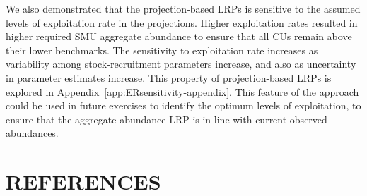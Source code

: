 \documentclass[11pt]{book}
\begin{document}
We also demonstrated that the projection-based LRPs is sensitive to the assumed levels of exploitation rate in the projections. Higher exploitation rates resulted in higher required SMU aggregate abundance to ensure that all CUs remain above their lower benchmarks. The sensitivity to exploitation rate increases as variability among stock-recruitment parameters increase, and also as uncertainty in parameter estimates increase. This property of projection-based LRPs is explored in Appendix~\ref{app:ERsensitivity-appendix}. This feature of the approach could be used in future exercises to identify the optimum levels of exploitation, to ensure that the aggregate abundance LRP is in line with current observed abundances.

\clearpage

\hypertarget{references}{%
\section{REFERENCES}\label{references}}

\noindent
\vspace{-2em}
\setlength{\parindent}{-0.2in}
\setlength{\leftskip}{0.2in}
\setlength{\parskip}{8pt}
\end{document}
